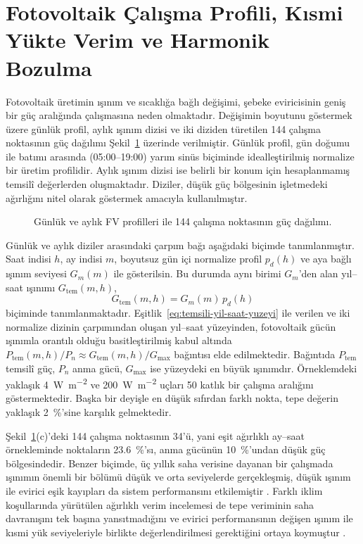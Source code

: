 \section{Fotovoltaik Çalışma Profili, Kısmi Yükte Verim ve Harmonik Bozulma}

Fotovoltaik üretimin ışınım ve sıcaklığa bağlı değişimi, şebeke eviricisinin geniş bir güç aralığında çalışmasına neden olmaktadır. Değişimin boyutunu göstermek üzere günlük profil, aylık ışınım dizisi ve iki diziden türetilen 144 çalışma noktasının güç dağılımı Şekil~\ref{fig:fv-calisma-profilleri} üzerinde verilmiştir. Günlük profil, gün doğumu ile batımı arasında (05:00--19:00) yarım sinüs biçiminde idealleştirilmiş normalize bir üretim profilidir. Aylık ışınım dizisi ise belirli bir konum için hesaplanmamış temsilî değerlerden oluşmaktadır. Diziler, düşük güç bölgesinin işletmedeki ağırlığını nitel olarak göstermek amacıyla kullanılmıştır.

\begin{figure}[H]
  \centering
  
  \caption{Günlük ve aylık FV profilleri ile 144 çalışma noktasının güç dağılımı.}
  \label{fig:fv-calisma-profilleri}
\end{figure}


Günlük ve aylık diziler arasındaki çarpım bağı aşağıdaki biçimde tanımlanmıştır. Saat indisi $h$, ay indisi $m$, boyutsuz gün içi normalize profil $p_d(h)$ ve aya bağlı ışınım seviyesi $G_m(m)$ ile gösterilsin. Bu durumda aynı birimi $G_m$'den alan yıl--saat ışınımı $G_{\mathrm{tem}}(m,h)$,
\begin{equation}
G_{\mathrm{tem}}(m,h)=G_m(m)\,p_d(h)
\label{eq:temsili-yil-saat-yuzeyi}
\end{equation}
biçiminde tanımlanmaktadır. Eşitlik~\eqref{eq:temsili-yil-saat-yuzeyi} ile verilen ve iki normalize dizinin çarpımından oluşan yıl--saat yüzeyinden, fotovoltaik gücün ışınımla orantılı olduğu basitleştirilmiş kabul altında $P_{\mathrm{tem}}(m,h)/P_n\approx G_{\mathrm{tem}}(m,h)/G_{\max}$ bağıntısı elde edilmektedir. Bağıntıda $P_{\mathrm{tem}}$ temsilî güç, $P_n$ anma gücü, $G_{\max}$ ise yüzeydeki en büyük ışınımdır. Örneklemdeki yaklaşık \SI{4}{\watt\per\metre\squared} ve \SI{200}{\watt\per\metre\squared} uçları 50 katlık bir çalışma aralığını göstermektedir. Başka bir deyişle en düşük sıfırdan farklı nokta, tepe değerin yaklaşık \SI{2}{\percent}'sine karşılık gelmektedir.

Şekil~\ref{fig:fv-calisma-profilleri}(c)'deki 144 çalışma noktasının 34'ü, yani eşit ağırlıklı ay--saat örnekleminde noktaların \SI{23.6}{\percent}'sı, anma gücünün \SI{10}{\percent}'undan düşük güç bölgesindedir. Benzer biçimde, üç yıllık saha verisine dayanan bir çalışmada ışınımın önemli bir bölümü düşük ve orta seviyelerde gerçekleşmiş, düşük ışınım ile evirici eşik kayıpları da sistem performansını etkilemiştir \citep{Mondol2007}. Farklı iklim koşullarında yürütülen ağırlıklı verim incelemesi de tepe veriminin saha davranışını tek başına yansıtmadığını ve evirici performansının değişen ışınım ile kısmi yük seviyeleriyle birlikte değerlendirilmesi gerektiğini ortaya koymuştur \citep{AbRahman2020}.


